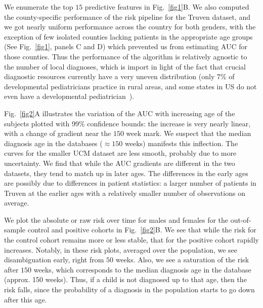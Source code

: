\documentclass[onecolumn, compsoc,11pt]{IEEEtran}
\def\treatment{positive\xspace}
\begin{document}
We enumerate the top $15$ predictive features in Fig.~\ref{fig1}B. 
We also computed the county-specific performance of the risk pipeline for the Truven dataset, and we got nearly uniform performance across the country for both genders, with the exception of  few isolated counties lacking patients in the appropriate age groups (See Fig.~\ref{fig1}, panels C and D) which prevented us from estimating AUC for those counties. Thus the performance of the algorithm is relatively agnostic to the number of local diagnoses, which is import in light of the fact that   crucial diagnostic resources currently have a very uneven distribution (only 7\% of developmental pediatricians practice in rural areas, and some states in US do not even have a developmental pediatrician~\cite{gordon2016whittling,althouse2006pediatric}).


Fig.~\ref{fig2}A illustrates the variation of the  AUC  with increasing age of the subjects plotted with 99\% confidence bounds: the increase is very nearly  linear, with a change of gradient near the $150$ week mark. We suspect that the median diagnosis age in the databases ($\approx 150$ weeks) manifests this inflection. The curves for the smaller UCM dataset are less smooth, probably due to more uncertainty. We find that while the AUC gradients are different in the two datasets, they tend to match up in later ages. The differences in the early ages are possibly due to differences in patient statistics: a larger number of patients in Truven at the earlier ages with a relatively smaller number of observations on average.

We plot the absolute or raw risk over time for males and females for the out-of-sample control and \treatment cohorts in Fig.~\ref{fig2}B. We see that while the risk for the control cohort remains more or less stable,   that for the \treatment cohort rapidly increases. Notably, in these risk plots, averaged over the population,   we see disambiguation  early, right from $50$ weeks. Also, we see a saturation of the risk after $150$ weeks, which corresponds to the median diagnosis age in the database (approx. 150 weeks). Thus, if a child is not diagnosed up to that age, then the  risk  falls, since the probability of a diagnosis in the population starts to go down after this age.
\end{document}
